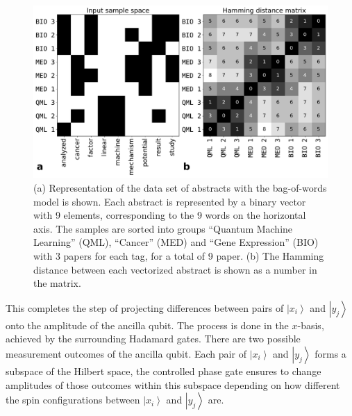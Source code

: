 \documentclass[%
  pra, aps, physrev,
  showkeys,
  twocolumn,
  showpacs,
  superscriptaddress,
  amsmath,amssymb,
  10pt
]{revtex4-2}
\begin{document}
\begin{figure}[t]
    \centering
  \includegraphics[width=1.85\columnwidth]{vectorized_sample.pdf}
  \caption{
    (a) Representation of the data set of abstracts with the bag-of-words \cite{weikang2016} model is shown.
    Each abstract is represented by a binary vector with 9 elements, corresponding to the 9 words on the horizontal axis.
    The samples are sorted into groups ``Quantum Machine Learning'' (QML), ``Cancer'' (MED) and ``Gene Expression'' (BIO) with 3 papers for each tag, for a total of 9 paper.
    (b) The Hamming distance between each vectorized abstract is shown as a number in the matrix.
  }
  \label{fig:vectorized_sample}
\end{figure}


This completes the step of projecting differences between pairs of $\left| x_i \right\rangle$ and $\left| y_j \right\rangle$ onto the amplitude of the ancilla qubit.
The process is done in the $x$-basis, achieved by the surrounding Hadamard gates.
There are two possible measurement outcomes of the ancilla qubit.
Each pair of $\left|x_i \right\rangle$ and $\left| y_j \right\rangle$ forms a subspace of the Hilbert space,
the controlled phase gate ensures to change amplitudes of those outcomes within this subspace depending on how different the spin configurations between $\left| x_i \right\rangle$ and $\left| y_j \right\rangle$ are.
\end{document}
